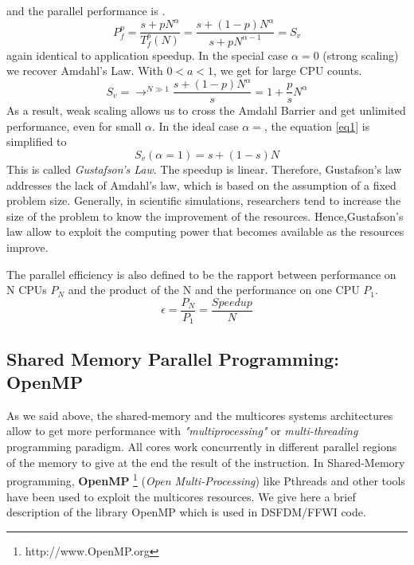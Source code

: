 and the parallel performance is .
\begin{equation} \label{eq1}
P_{f}^{p} =  \frac{s+pN^{\alpha}}{T_{f}^{p}(N)}  = \frac{s+(1-p)N^{\alpha}}{s+pN^{\alpha -1}} = S_v
\end{equation}
again identical to application speedup. In the special case $\alpha = 0$ (strong scaling) we recover Amdahl's Law. With $0 <a < 1$, we get for large CPU counts.
\begin{equation}
S_v = \longrightarrow^{N \gg 1} \frac{s+(1-p)N^{\alpha}}{s} = 1 + \frac{p}{s} N^{\alpha}
\end{equation}
As a result, weak scaling allows us to cross the Amdahl Barrier and get unlimited performance, even for small $\alpha$. In the ideal case $\alpha = $, the equation \ref{eq1} is simplified to
\begin{equation}
S_v(\alpha = 1)= s + (1-s)N
\end{equation}
This is called \textit{Gustafson's Law}. The speedup is linear. Therefore, Gustafson's law addresses the lack of Amdahl's law, which is based on the assumption of a fixed problem size. Generally, in scientific simulations, researchers tend to increase the size of the problem to know the improvement of the resources. Hence,Gustafson's law allow to exploit the computing power that becomes available as the resources improve.
 
The parallel efficiency is also defined to be the rapport between performance on N CPUs $P_N$ and the product of the N and the performance on one CPU $P_1$.
\begin{equation}
\epsilon = \frac{P_N}{P_1} = \frac{Speedup}{N}
\end{equation}
\subsection{Shared Memory Parallel Programming: OpenMP} \label{openMP}
As we said above, the shared-memory and the multicores systems architectures allow to get more performance with \textit{"multiprocessing"} or \textit{multi-threading} programming paradigm. All cores work concurrently in different parallel regions of the memory to give at the end the result of the instruction. In Shared-Memory programming, \textbf{OpenMP} \footnote{http://www.OpenMP.org} (\textit{Open Multi-Processing}) like Pthreads and other tools have been used to exploit the multicores resources. We give here a brief description of the library OpenMP which is used in DSFDM/FFWI code.

